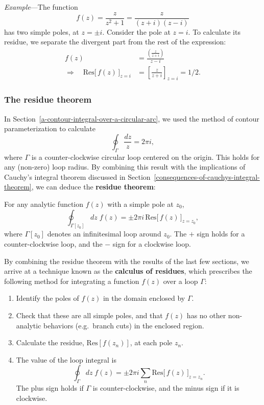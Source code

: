 \documentclass[10pt,a4paper]{article}
\begin{document}
\begin{framed} \noindent
  \textit{Example}---The function \[f(z) = \frac{z}{z^2 + 1} =
  \frac{z}{(z+i)(z-i)}\] has two simple poles, at $z = \pm
  i$. Consider the pole at $z = i$. To calculate its residue, we
  separate the divergent part from the rest of the expression:
  \begin{align}f(z) &= \frac{\left(\frac{z}{z+i}\right)}{z-i} \\ \Rightarrow\quad \mathrm{Res}\big[\,f(z)\,\big]_{z=i} &= \left[\frac{z}{z+i}\right]_{z=i} = 1/2.\end{align}
\end{framed}

\subsubsection{The residue theorem}
\label{the-residue-theorem}

In Section~\ref{a-contour-integral-over-a-circular-arc}, we used the
method of contour parameterization to calculate
\begin{equation}
\oint_{\Gamma} \frac{dz}{z} = 2\pi i,
\end{equation}
where $\Gamma$ is a counter-clockwise circular loop centered on the
origin. This holds for any (non-zero) loop radius. By combining this
result with the implications of Cauchy's integral theorem discussed in
Section~\ref{consequences-of-cauchys-integral-theorem}, we can deduce
the \textbf{residue theorem}:

\begin{framed} \noindent
For any analytic function $f(z)$ with a simple pole at $z_0$,
\[\oint_{\Gamma[z_0]} dz \; f(z) = \pm 2\pi i \, \mathrm{Res}\big[\,f(z)\,\big]_{z = z_0},\]
where $\Gamma[z_0]$ denotes an infinitesimal loop around $z_0$. The
$+$ sign holds for a counter-clockwise loop, and the $-$ sign for a
clockwise loop.
\end{framed}

By combining the residue theorem with the results of the last few
sections, we arrive at a technique known as the \textbf{calculus of
residues}, which prescribes the following method for integrating a
function $f(z)$ over a loop $\Gamma$:

\begin{enumerate}
\item
  Identify the poles of $f(z)$ in the domain enclosed by $\Gamma$.
\item
  Check that these are all simple poles, and that $f(z)$ has no other
  non-analytic behaviors (e.g.~branch cuts) in the enclosed region.
\item
  Calculate the residue, $\mathrm{Res}[f(z_n)]$, at each pole $z_n$.
\item
  The value of the loop integral is
  \[\oint_\Gamma dz\; f(z) = \pm 2\pi i \sum_n \mathrm{Res}\big[\,f(z)\,\big]_{z = z_n}.\]The
  plus sign holds if $\Gamma$ is counter-clockwise, and the minus sign
  if it is clockwise.
\end{enumerate}
\end{document}
